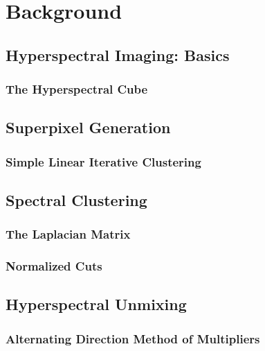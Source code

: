 \documentclass[12pt]{article}
\begin{document}
\clearpage
% 
% 
% 
% 
% 
\section{Background} \label{Background}
\subsection{Hyperspectral Imaging: Basics} \label{Basics}

\subsubsection{The Hyperspectral Cube} \label{Cube}


\clearpage
\subsection{Superpixel Generation} \label{Superpixel}

\subsubsection{Simple Linear Iterative Clustering} \label{SLIC}


\clearpage
\subsection{Spectral Clustering} \label{Spectral Clustering}

\subsubsection{The Laplacian Matrix} \label{Graph Laplacian}
\subsubsection{Normalized Cuts} \label{Normalized Cuts}

\clearpage
\subsection{Hyperspectral Unmixing} \label{Unmixing Intro}
\subsubsection{Alternating Direction Method of Multipliers}\label{ADMM Intro}
\end{document}
